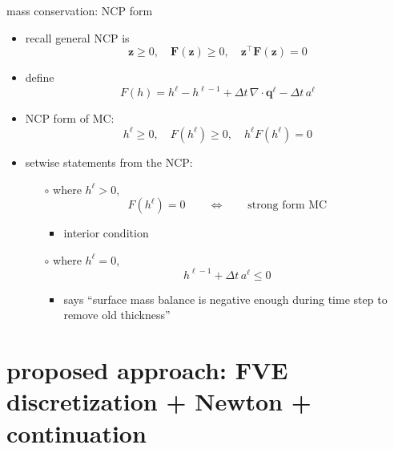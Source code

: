 \documentclass[xcolor={dvipsnames}]{beamer}
\newcommand\bq{\mathbf{q}}
\newcommand\bz{\mathbf{z}}
\newcommand\bF{\mathbf{F}}
\newcommand\Div{\nabla\cdot}
\begin{document}
\begin{frame}{mass conservation: NCP form}

\begin{itemize}
\item recall general NCP is
  $$\bz \ge 0, \quad \bF(\bz) \ge 0, \quad \bz^\top \bF(\bz) = 0$$
\item define
    $$F(h) = h^\ell - h^{\ell-1} + \Delta t\, \Div \bq^\ell - \Delta t\, a^\ell$$
\item NCP form of MC:
   $$h^\ell \ge 0, \quad F(h^\ell) \ge 0, \quad h^\ell F(h^\ell) = 0$$
\item setwise statements from the NCP:
    \begin{itemize}
    \item[$\circ$] where $h^\ell > 0$,
        $$F(h^\ell) = 0 \qquad \iff \qquad \text{strong form MC}$$
        \vspace{-4mm}
        \begin{itemize}
        \item interior condition
        \end{itemize}
    \item[$\circ$] where $h^\ell = 0$,
        $$h^{\ell-1} + \Delta t\, a^\ell \le 0$$
        \vspace{-4mm}
        \begin{itemize}
        \item says ``surface mass balance is negative enough during time step to remove old thickness''
        \end{itemize}
    \end{itemize}
\end{itemize}
\end{frame}


\section{proposed approach: FVE discretization + Newton + continuation}
\end{document}
